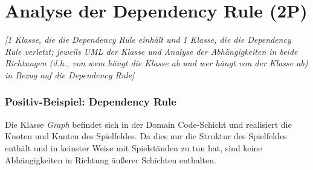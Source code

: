 \section{Analyse der Dependency Rule (2P)}
\emph{[1 Klasse, die die Dependency Rule einhält und 1 Klasse, die die Dependency Rule verletzt; jeweils
UML der Klasse und Analyse der Abhängigkeiten in beide Richtungen (d.h., von wem hängt die Klasse
ab und wer hängt von der Klasse ab) in Bezug auf die Dependency Rule]}

\subsubsection{Positiv-Beispiel: Dependency Rule}
\noindent Die Klasse \emph{Graph} befindet sich in der Domain Code-Schicht und realisiert die Knoten und Kanten des Spielfeldes. Da dies nur die Struktur des Spielfeldes enthält und in keinster Weise mit Spielständen zu tun hat, sind keine Abhängigkeiten in Richtung äußerer Schichten enthalten.

